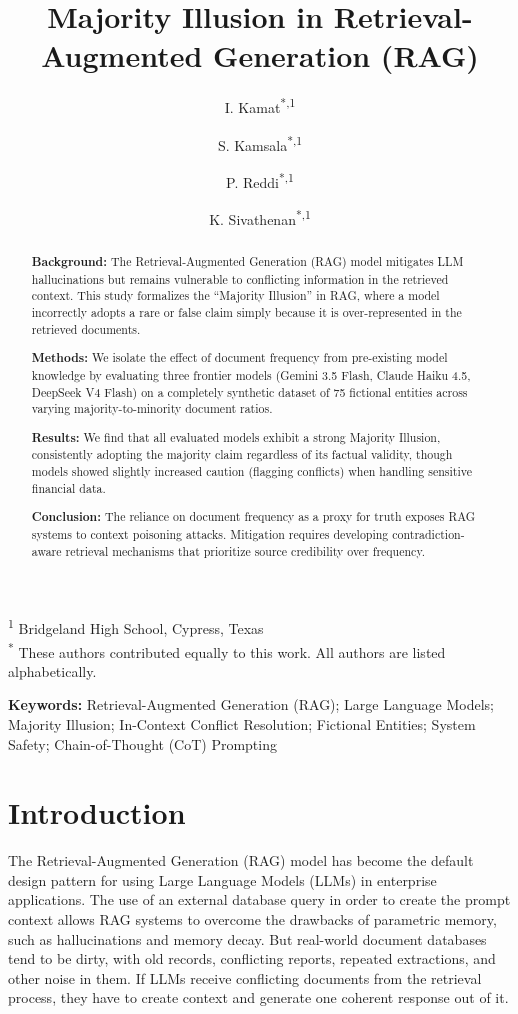 \documentclass{article}
\title{Majority Illusion in Retrieval-Augmented Generation (RAG)}
\author{
    I. Kamat\textsuperscript{*,1} \and 
    S. Kamsala\textsuperscript{*,1} \and 
    P. Reddi\textsuperscript{*,1} \and 
    K. Sivathenan\textsuperscript{*,1}
}
\date{}
\begin{document}
\maketitle

\begin{center}
    \small
    \textsuperscript{1} Bridgeland High School, Cypress, Texas \\
    \textsuperscript{*} These authors contributed equally to this work. All authors are listed alphabetically.
\end{center}

\begin{abstract}
\textbf{Background:} The Retrieval-Augmented Generation (RAG) model mitigates LLM hallucinations but remains vulnerable to conflicting information in the retrieved context. This study formalizes the ``Majority Illusion'' in RAG, where a model incorrectly adopts a rare or false claim simply because it is over-represented in the retrieved documents.

\textbf{Methods:} We isolate the effect of document frequency from pre-existing model knowledge by evaluating three frontier models (Gemini 3.5 Flash, Claude Haiku 4.5, DeepSeek V4 Flash) on a completely synthetic dataset of 75 fictional entities across varying majority-to-minority document ratios.

\textbf{Results:} We find that all evaluated models exhibit a strong Majority Illusion, consistently adopting the majority claim regardless of its factual validity, though models showed slightly increased caution (flagging conflicts) when handling sensitive financial data.

\textbf{Conclusion:} The reliance on document frequency as a proxy for truth exposes RAG systems to context poisoning attacks. Mitigation requires developing contradiction-aware retrieval mechanisms that prioritize source credibility over frequency.
\end{abstract}

\textbf{Keywords:} Retrieval-Augmented Generation (RAG); Large Language Models; Majority Illusion; In-Context Conflict Resolution; Fictional Entities; System Safety; Chain-of-Thought (CoT) Prompting

\section{Introduction}

The Retrieval-Augmented Generation (RAG) model has become the default design pattern for using Large Language Models (LLMs) in enterprise applications. The use of an external database query in order to create the prompt context allows RAG systems to overcome the drawbacks of parametric memory, such as hallucinations and memory decay. But real-world document databases tend to be dirty, with old records, conflicting reports, repeated extractions, and other noise in them. If LLMs receive conflicting documents from the retrieval process, they have to create context and generate one coherent response out of it.
\end{document}
